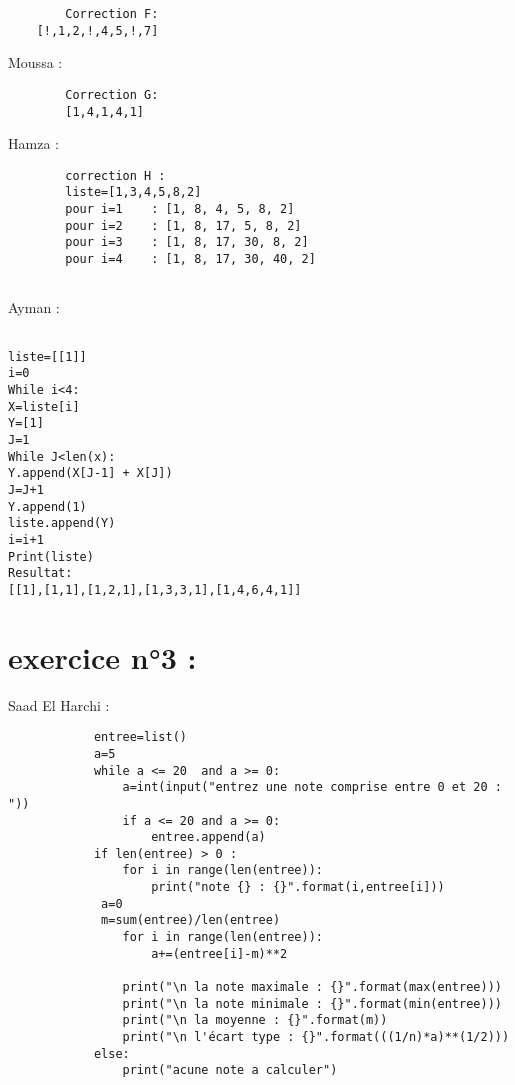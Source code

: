 \documentclass{article}
\begin{document}
	\begin{verbatim}
		Correction F:
	[!,1,2,!,4,5,!,7]

	\end{verbatim}
	
    	\begin{center}
    		Moussa :
	\end{center} 
	
	\begin{verbatim}
		Correction G:
		[1,4,1,4,1]
	\end{verbatim}

    	\begin{center}
    		Hamza :
	\end{center} 
	\begin{verbatim}
		correction H :
		liste=[1,3,4,5,8,2]
		pour i=1    : [1, 8, 4, 5, 8, 2]
		pour i=2    : [1, 8, 17, 5, 8, 2]
		pour i=3    : [1, 8, 17, 30, 8, 2]
		pour i=4    : [1, 8, 17, 30, 40, 2]
		
	\end{verbatim}

	\begin{center}
    		Ayman :
	\end{center} 
	\begin{verbatim}
	
liste=[[1]]
i=0
While i<4:
X=liste[i]
Y=[1]
J=1
While J<len(x):
Y.append(X[J-1] + X[J])
J=J+1
Y.append(1)
liste.append(Y)
i=i+1
Print(liste)
Resultat:
[[1],[1,1],[1,2,1],[1,3,3,1],[1,4,6,4,1]]
\end{verbatim}
\section{exercice n°3 :}
        \begin{center}
    		Saad El Harchi :
	\end{center}    	  
        	
    	\begin{verbatim}
			entree=list()
			a=5
			while a <= 20  and a >= 0:
    			a=int(input("entrez une note comprise entre 0 et 20 : "))
    			if a <= 20 and a >= 0:
        			entree.append(a) 
			if len(entree) > 0 :
    			for i in range(len(entree)):
        			print("note {} : {}".format(i,entree[i]))
   			 a=0
   			 m=sum(entree)/len(entree)
    			for i in range(len(entree)):
        			a+=(entree[i]-m)**2
    
    			print("\n la note maximale : {}".format(max(entree)))
    			print("\n la note minimale : {}".format(min(entree)))
    			print("\n la moyenne : {}".format(m))
    			print("\n l'écart type : {}".format(((1/n)*a)**(1/2)))
			else:
    			print("acune note a calculer")
		\end{verbatim}
\end{document}

